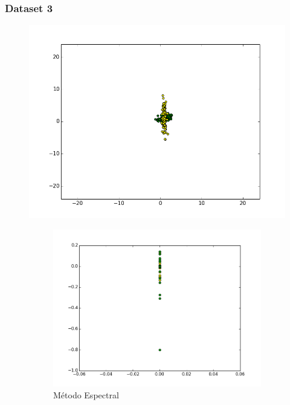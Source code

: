 \documentclass[a4paper,12pt]{article}    %
\begin{document}
\subsubsection{Dataset 3}
\begin{figure}[!ht]
	\centering
	\includegraphics[width=\linewidth]{img/7dataset.png}
	\caption*{N=200, cov1=[[0.1, 0], [0, 8]], cov2=[[0.9, 0.2], [0.2, 0.3]]}
	\begin{subfigure}{.45\textwidth}
		\centering
		\includegraphics[width=\linewidth]{img/8spectral.png}
		\caption{Método Espectral}
	\end{subfigure}
	\begin{subfigure}{.45\textwidth}
		\centering

\end{subfigure}
\end{figure}
\end{document}
